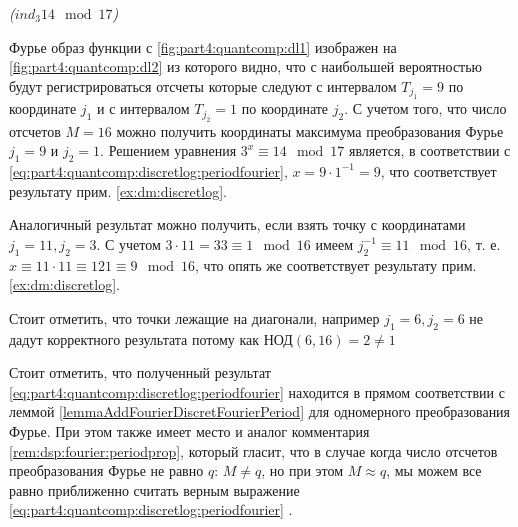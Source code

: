 \begin{example}
\emph{($ind_3{14} \mod{17}$)}
%



Фурье образ функции с \autoref{fig:part4:quantcomp:dl1} изображен на
\autoref{fig:part4:quantcomp:dl2} из которого видно, что с наибольшей
вероятностью будут регистрироваться отсчеты которые следуют с
интервалом $T_{j_1} = 9$ по координате $j_1$ и с интервалом $T_{j_2} =
1$ по координате $j_2$. С учетом того, что число отсчетов $M=16$ можно
получить координаты максимума преобразования Фурье $j_1 = 9$
и $j_2 = 1$. Решением уравнения $3^x \equiv 14 \mod 17$
является, в соответствии с
\eqref{eq:part4:quantcomp:discretlog:periodfourier}, $x = 9 \cdot 1^{-1}
= 9$, что соответствует результату прим. 
\ref{ex:dm:discretlog}.

Аналогичный результат можно получить, если взять точку с координатами 
$j_1 = 11, j_2 = 3$. С учетом $3 \cdot 11 = 33 \equiv 1 \mod 16$ имеем
$j_2^{-1} \equiv 11 \mod 16$, т. е. $x \equiv 11 \cdot 11 \equiv 121
\equiv 9 \mod 16$, что опять же соответствует результату прим. 
\ref{ex:dm:discretlog}.

Стоит отметить, что точки лежащие на диагонали, например $j_1 = 6, j_2
= 6$ не дадут корректного результата потому как $\mbox{НОД}\left(6,
16\right) = 2 \ne 1$

\label{ex:part4:quantcomp:discretlog:periodfinding}
\end{example}

Стоит отметить, что полученный результат
\eqref{eq:part4:quantcomp:discretlog:periodfourier} находится в прямом
соответствии с леммой \ref{lemmaAddFourierDiscretFourierPeriod} для
одномерного преобразования Фурье. При этом также имеет место и аналог
комментария \ref{rem:dsp:fourier:periodprop}, который гласит, что в
случае когда число отсчетов преобразования Фурье не равно $q$: $M \ne
q$, но при этом $M \approx q$, мы можем все равно приближенно считать
верным выражение 
\eqref{eq:part4:quantcomp:discretlog:periodfourier}
\cite{Proos:2003:SDL:2011528.2011531}.  


